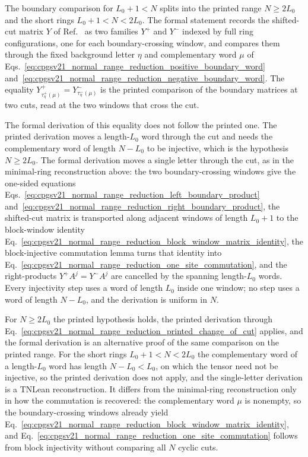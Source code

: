 \documentclass{article}
\begin{document}
The boundary comparison for $L_0+1<N$ splits into the printed range
$N\geq 2L_0$ and the short rings $L_0+1<N<2L_0$. The formal statement
 records
the shifted-cut matrix $Y$ of Ref.~\cite{PerezGarcia2007Matrix} as two
families $Y^+$ and $Y^-$ indexed by full ring configurations, one for each
boundary-crossing window, and compares them through the fixed background
letter $\eta$ and complementary word $\mu$ of
Eqs.~\ref{eq:cpgsv21_normal_range_reduction_positive_boundary_word}
and~\ref{eq:cpgsv21_normal_range_reduction_negative_boundary_word}. The
equality $Y^+_{\tau^+_\eta(\mu)}=Y^-_{\tau^-_\eta(\mu)}$ is the printed
comparison of the boundary matrices at two cuts, read at the two windows
that cross the cut.

The formal derivation of this equality does not follow the printed one. The
printed derivation moves a length-$L_0$ word through the cut and needs the
complementary word of length $N-L_0$ to be injective, which is the
hypothesis $N\geq 2L_0$. The formal derivation moves a single letter through
the cut, as in the minimal-ring reconstruction above: the two
boundary-crossing windows give the one-sided equations
Eqs.~\ref{eq:cpgsv21_normal_range_reduction_left_boundary_product}
and~\ref{eq:cpgsv21_normal_range_reduction_right_boundary_product}, the
shifted-cut matrix is transported along adjacent windows of length $L_0+1$ to
the block-window identity
Eq.~\ref{eq:cpgsv21_normal_range_reduction_block_window_matrix_identity},
the block-injective commutation lemma turns that identity into
Eq.~\ref{eq:cpgsv21_normal_range_reduction_one_site_commutation}, and the
right-products $Y^+A^j=Y^-A^j$ are cancelled by the spanning length-$L_0$
words. Every injectivity step uses a word of length $L_0$ inside one window;
no step uses a word of length $N-L_0$, and the derivation is uniform in $N$.

For $N\geq 2L_0$ the printed hypothesis holds, the printed derivation through
Eq.~\ref{eq:cpgsv21_normal_range_reduction_printed_change_of_cut} applies,
and the formal derivation is an alternative proof of the same comparison on
the printed range. For the short rings $L_0+1<N<2L_0$ the complementary word
of a length-$L_0$ word has length $N-L_0<L_0$, on which the tensor need not
be injective, so the printed derivation does not apply, and the single-letter
derivation is a TNLean reconstruction. It differs from the minimal-ring
reconstruction only in how the commutation is recovered: the complementary
word $\mu$ is nonempty, so the boundary-crossing windows already yield
Eq.~\ref{eq:cpgsv21_normal_range_reduction_block_window_matrix_identity},
and Eq.~\ref{eq:cpgsv21_normal_range_reduction_one_site_commutation} follows
from block injectivity without comparing all $N$ cyclic cuts.
\end{document}
